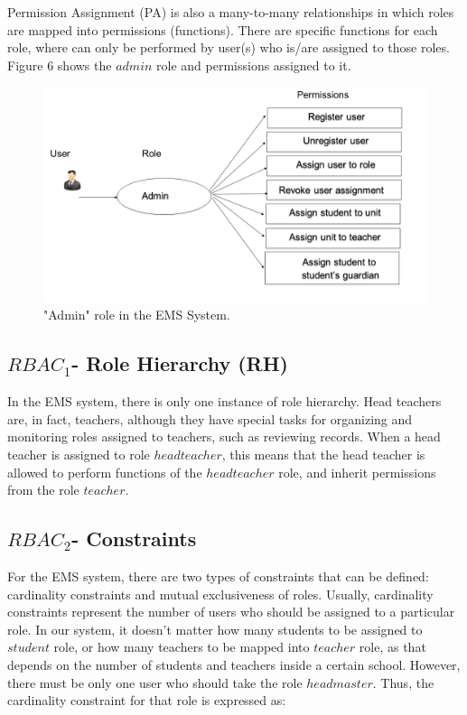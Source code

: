 Permission Assignment (PA) is also a many-to-many relationships in which roles are mapped into permissions (functions).  There are specific functions for each role, where can only be performed by user(s) who is/are assigned to those roles.  Figure 6 shows the $admin$ role and permissions assigned to it.

\begin{figure}[bht]
\centering
\includegraphics[scale=0.26]{addAdmin.png}
\caption{"Admin" role in the EMS System.}
\label{fig:permstud}
\end{figure}


\subsection{$RBAC_1$- Role Hierarchy (RH)}

In the EMS system, there is only one instance of role hierarchy.  Head teachers are, in fact, teachers, although they have special tasks for organizing and monitoring roles assigned to teachers, such as reviewing records.  When a head teacher is assigned to role $headteacher$, this means that the head teacher is allowed to perform functions of the $headteacher$ role, and inherit permissions from the role $teacher$.

\subsection{$RBAC_2$- Constraints}

For the EMS system, there are two types of constraints that can be defined: cardinality constraints and mutual exclusiveness of roles.  Usually, cardinality constraints represent the number of users who should be assigned to a particular role.  In our system, it doesn't matter how many students to be assigned to $student$ role, or how many teachers to be mapped into $teacher$ role, as that depends on the number of students and teachers inside a certain school.  However, there must be only one user who should take the role $headmaster$.  Thus, the cardinality constraint for that role  is expressed as:

